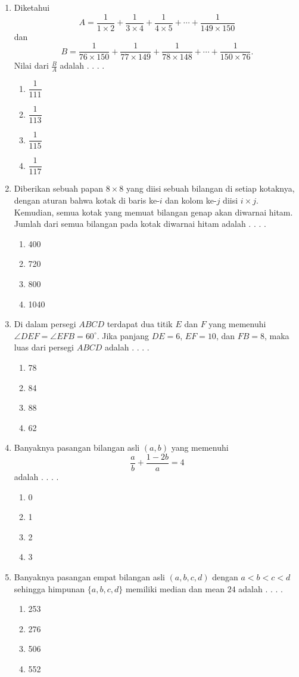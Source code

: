 \documentclass{article}
\begin{document}
\begin{enumerate}
    \item Diketahui
    $$ A =\frac{1}{1\times 2} + \frac{1}{3\times 4}+\frac{1}{4\times 5}+\cdots + \frac{1}{149\times 150} $$
    dan 
    $$ B =\frac{1}{76\times 150} + \frac{1}{77\times 149} + \frac{1}{78\times 148}+\cdots + \frac{1}{150\times 76}. $$
    Nilai dari $\frac{B}{A}$ adalah . . . .
    \begin{enumerate}[label={(\Alph*)}]
        \item $\dfrac{1}{111}$ \item $\dfrac{1}{113}$ \item $\dfrac{1}{115}$ \item $\dfrac{1}{117}$
    \end{enumerate}

    \item Diberikan sebuah papan $8\times 8$ yang diisi sebuah bilangan di setiap kotaknya, dengan aturan bahwa kotak di baris ke-$i$ dan kolom ke-$j$ diisi $i\times j$. Kemudian, semua kotak yang memuat bilangan genap akan diwarnai hitam. Jumlah dari semua bilangan pada kotak diwarnai hitam adalah . . . .
    \begin{enumerate}[label={(\Alph*)}]
        \item 400 \item 720 \item 800 \item 1040
    \end{enumerate}

    \item Di dalam persegi $ABCD$ terdapat dua titik $E$ dan $F$ yang memenuhi $\angle DEF=\angle EFB=60^\circ$. Jika panjang $DE=6$, $EF=10$, dan $FB=8$, maka luas dari persegi $ABCD$ adalah . . . .
    \begin{enumerate}[label={(\Alph*)}]
        \item 78 \item 84 \item 88 \item 62
    \end{enumerate}

    \item Banyaknya pasangan bilangan asli $(a,b)$ yang memenuhi
    $$\frac{a}{b} + \frac{1-2b}{a} =4$$
    adalah . . . .
    \begin{enumerate}[label={(\Alph*)}]
        \item 0 \item 1 \item 2 \item 3
    \end{enumerate}

    \item Banyaknya pasangan empat bilangan asli $(a,b,c,d)$ dengan $a<b<c<d$ sehingga himpunan $\{a,b,c,d\}$ memiliki median dan mean $24$ adalah . . . .
    \begin{enumerate}[label={(\Alph*)}]
        \item 253 \item 276 \item 506 \item 552
    \end{enumerate}

\end{enumerate}
\end{document}
